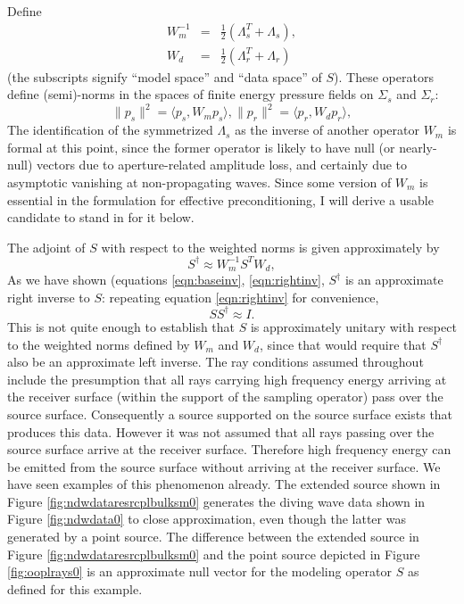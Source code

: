 \documentclass[georeport,12pt]{geophysics}
\begin{document}
Define
\begin{eqnarray}
  W_m^{-1}&=& \frac{1}{2}(\Lambda_s^T+
              \Lambda_s),\nonumber \\
  W_d &=& \frac{1}{2}(\Lambda_r^T+ \Lambda_r)
          \label{eqn:wdef}
\end{eqnarray}
(the subscripts signify ``model space'' and ``data space'' of $S$).
These operators define (semi)-norms in the spaces of finite energy
pressure fields on $\Sigma_s$ and $\Sigma_r$:
\[
  \|p_s\|^2 = \langle p_s, W_m p_s\rangle,  \|p_r\|^2 = \langle p_r,
  W_d p_r\rangle,
\] 
The identification of the symmetrized $\Lambda_s$ as the inverse
of another operator $W_m$ is formal at this point, since the former operator is
likely to have null (or nearly-null) vectors due to aperture-related
amplitude loss, and certainly due to asymptotic vanishing at
non-propagating waves. Since some version of $W_m$ is essential in the
formulation for effective preconditioning, I will derive a usable
candidate to stand in for it below.

The adjoint of $S$ with respect to the weighted norms is given
approximately by
\begin{equation}
\label{eqn:wadj}
S^{\dagger} \approx  W_m^{-1}S^TW_d,
\end{equation}
As we have shown (equations \ref{eqn:baseinv}, \ref{eqn:rightinv},
$S^{\dagger}$ is an approximate right inverse to $S$: repeating
equation \ref{eqn:rightinv} for convenience,
\begin{equation}
  \label{eqn:wunitary}
  SS^{\dagger} \approx I.
\end{equation}
This is not quite enough to establish that
$S$ is approximately unitary with respect to the
weighted norms defined by $W_m$ and $W_d$, since that would require
that $S^{\dagger}$ also be an approximate left inverse. The ray
conditions assumed throughout include the presumption that all rays
carrying high frequency energy arriving at the receiver surface
(within the support of the sampling operator) pass
over the source surface. Consequently a source supported on the source
surface exists that produces this data. However it was not assumed
that all rays passing over the source surface arrive at the receiver
surface. Therefore high frequency energy can be emitted from the
source surface without arriving at the receiver surface. We have seen
examples of this phenomenon already. The extended source shown in Figure
\ref{fig:ndwdataresrcplbulksm0} generates the diving wave data shown
in Figure \ref{fig:ndwdata0} to close approximation, even though the
latter was generated by a point source. The difference between the
extended source in Figure \ref{fig:ndwdataresrcplbulksm0} and the
point source depicted in Figure \ref{fig:ooplrays0} is an approximate
null vector for the modeling operator $S$ as defined for this
example.
\end{document}
